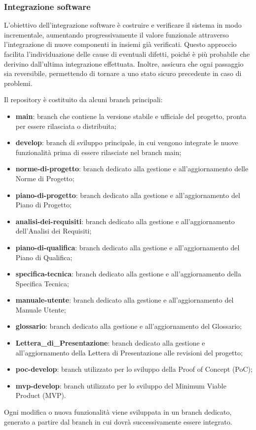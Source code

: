 \subsubsection{Integrazione software}
L'obiettivo dell'integrazione software è costruire e verificare il sistema in modo incrementale, aumentando progressivamente il valore funzionale attraverso l'integrazione di nuove componenti in insiemi già verificati. Questo approccio facilita l'individuazione delle cause di eventuali difetti, poiché è più probabile che derivino dall'ultima integrazione effettuata. Inoltre, assicura che ogni passaggio sia reversibile, permettendo di tornare a uno stato sicuro precedente in caso di problemi.

Il repository è costituito da alcuni branch principali:
\begin{itemize}
    \item \textbf{main}: branch che contiene la versione stabile e ufficiale del progetto, pronta per essere rilasciata o distribuita;
    \item \textbf{develop}: branch di sviluppo principale, in cui vengono integrate le nuove funzionalità prima di essere rilasciate nel branch main;
    \item \textbf{norme-di-progetto}: branch dedicato alla gestione e all'aggiornamento delle Norme di Progetto;
    \item \textbf{piano-di-progetto}: branch dedicato alla gestione e all'aggiornamento del Piano di Progetto;
    \item \textbf{analisi-dei-requisiti}: branch dedicato alla gestione e all'aggiornamento dell'Analisi dei Requisiti;
    \item \textbf{piano-di-qualifica}: branch dedicato alla gestione e all'aggiornamento del Piano di Qualifica;
    \item \textbf{specifica-tecnica}: branch dedicato alla gestione e all'aggiornamento della Specifica Tecnica;
    \item \textbf{manuale-utente}: branch dedicato alla gestione e all'aggiornamento del Manuale Utente;
    \item \textbf{glossario}: branch dedicato alla gestione e all'aggiornamento del Glossario;
    \item \textbf{Lettera\_di\_Presentazione}: branch dedicato alla gestione e all'aggiornamento della Lettera di Presentazione alle revisioni del progetto;
    \item \textbf{poc-develop}: branch utilizzato per lo sviluppo della Proof of Concept (PoC);
    \item \textbf{mvp-develop}: branch utilizzato per lo sviluppo del Minimum Viable Product (MVP).
\end{itemize}
Ogni modifica o nuova funzionalità viene sviluppata in un branch dedicato, generato a partire dal branch in cui dovrà successivamente essere integrato.

